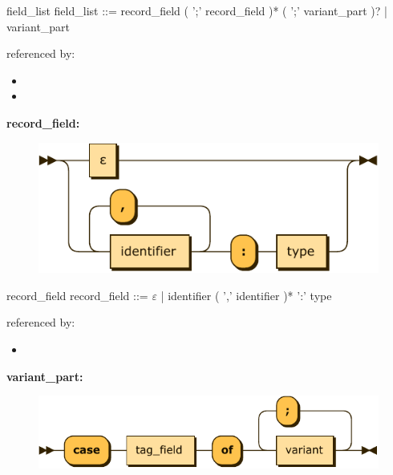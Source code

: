 \documentclass[10pt,a4paper,twoside]{article}
\providecommand{\tightlist}{%
  \setlength{\itemsep}{0pt}\setlength{\parskip}{0pt}}
\newcounter{grammarbox}[section]
\begin{document}
\begin{grammarbox}{field\_list}
\vspace{0.5em}
 field\_list
         ::= record\_field ( ';' record\_field )* ( ';' variant\_part )?
           | variant\_part
\end{grammarbox}

referenced by:

\begin{itemize}
\tightlist
\item
\item
\end{itemize}

\textbf{record\_field:}

\begin{figure}[H]
\centering
\includegraphics{diagram/record_field.pdf}

\end{figure}

\begin{grammarbox}{record\_field}
\vspace{0.5em}
record\_field
         ::= $\varepsilon$
           | identifier ( ',' identifier )* ':' type
\end{grammarbox}

referenced by:

\begin{itemize}
\tightlist
\item
\end{itemize}

\textbf{variant\_part:}

\begin{figure}[H]
\centering
\includegraphics{diagram/variant_part.pdf}

\end{figure}
\end{document}
